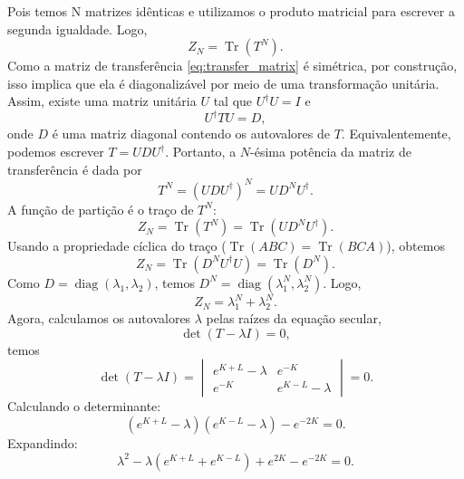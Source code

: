 \documentclass[11pt,a4paper]{article}
\begin{document}
%
Pois temos N matrizes idênticas e utilizamos o produto matricial para escrever a segunda igualdade.
Logo,
%
\begin{equation}
Z_N = \operatorname{Tr}\left( T^N \right).
\end{equation}
%
Como a matriz de transferência \eqref{eq:transfer_matrix} é simétrica, por construção, isso implica que ela é diagonalizável por meio de uma transformação unitária. Assim, existe uma matriz unitária $U$ tal que $U^\dagger U = I$ e
%
\begin{equation}
U^\dagger T U = D,
\end{equation}
%
onde $D$ é uma matriz diagonal contendo os autovalores de $T$. Equivalentemente, podemos escrever $T = U D U^\dagger$. Portanto, a $N$-ésima potência da matriz de transferência é dada por
%
\begin{equation}
T^N = (U D U^\dagger)^N = U D^N U^\dagger.
\end{equation} 
%
A função de partição é o traço de $T^N$:
%
\begin{equation}
Z_N = \operatorname{Tr}(T^N)
= \operatorname{Tr}(U D^N U^\dagger).
\end{equation}
%
Usando a propriedade cíclica do traço ($\operatorname{Tr}(ABC) = \operatorname{Tr}(BCA)$), obtemos
%
\begin{equation}
Z_N = \operatorname{Tr}(D^N U^\dagger U) = \operatorname{Tr}(D^N).
\end{equation}
%
Como $D = \operatorname{diag}(\lambda_1, \lambda_2)$, temos $D^N = \operatorname{diag}(\lambda_1^N, \lambda_2^N)$. Logo,
%
\begin{equation}
Z_N = \lambda_1^N + \lambda_2^N.
\label{eq:Z_autovalores_spin_half}
\end{equation}
%
Agora, calculamos os autovalores $\lambda$ pelas raízes da equação secular,
%
\begin{equation}
\det(T - \lambda I) = 0,
\end{equation}
%
temos
%
\begin{equation}
\det(T - \lambda I) =
\begin{vmatrix}
e^{K+L} - \lambda & e^{-K} \\
e^{-K} & e^{K-L} - \lambda
\end{vmatrix}
= 0.
\end{equation}
%
Calculando o determinante:
%
\begin{equation}
(e^{K+L} - \lambda)(e^{K-L} - \lambda) - e^{-2K} = 0.
\end{equation}
%
Expandindo:
%
\begin{equation}
\lambda^2 - \lambda (e^{K+L} + e^{K-L}) + e^{2K} - e^{-2K} = 0.
\end{equation}
\end{document}
